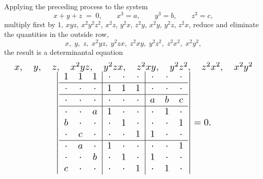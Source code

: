 \documentclass[11pt]{article}
\begin{document}
Applying the preceding process to the system
\[
x + y + z \;=\; 0,\qquad x^{3} = a,\qquad y^{3} = b,\qquad z^{3} = c,
\]
multiply first by $1$, $xyz$, $x^{2}y^{2}z^{2}$, $x^{2}z$, $y^{2}x$, $z^{2}y$, $x^{2}y$, $y^{2}z$, $z^{2}x$, reduce and eliminate the quantities in the outside row,
\[
x,\; y,\; z,\; x^{2}yz,\; y^{2}zx,\; z^{2}xy,\; y^{2}z^{2},\; z^{2}x^{2},\; x^{2}y^{2},
\]
the result is a determinantal equation
\[
\resizebox{\textwidth}{!}{%
$\begin{array}{c}
x,\quad y,\quad z,\quad x^{2}yz,\quad y^{2}zx,\quad z^{2}xy,\quad y^{2}z^{2},\quad z^{2}x^{2},\quad x^{2}y^{2} \\[-0.2em]
\left|
\begin{array}{ccc|ccc|ccc}
1 & 1 & 1 & \cdot & \cdot & \cdot & \cdot & \cdot & \cdot \\
\hline
\cdot & \cdot & \cdot & 1 & 1 & 1 & \cdot & \cdot & \cdot \\
\hline
\cdot & \cdot & \cdot & \cdot & \cdot & \cdot & a & b & c \\
\hline
\cdot & \cdot & a & 1 & \cdot & \cdot & \cdot & 1 & \cdot \\
b & \cdot & \cdot & \cdot & 1 & \cdot & \cdot & \cdot & 1 \\
\cdot & c & \cdot & \cdot & \cdot & 1 & 1 & \cdot & \cdot \\
\hline
\cdot & a & \cdot & 1 & \cdot & \cdot & \cdot & \cdot & 1 \\
\cdot & \cdot & b & \cdot & 1 & \cdot & 1 & \cdot & \cdot \\
c & \cdot & \cdot & \cdot & \cdot & 1 & \cdot & 1 & \cdot
\end{array}
\right| = 0.
\end{array}$%
}
\]

\medskip
\end{document}
